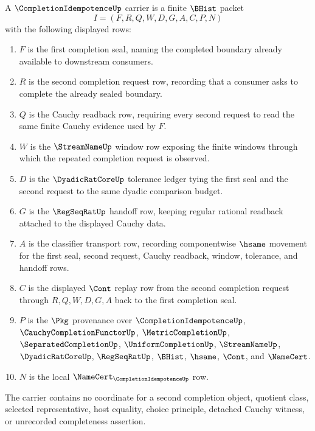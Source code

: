 \begin{definition}
\label{def:completion-idempotence-carrier}
A $\CompletionIdempotenceUp$ carrier is a finite $\BHist$ packet
$$
I=(F,R,Q,W,D,G,A,C,P,N)
$$
with the following displayed rows:
\begin{enumerate}
\item $F$ is the first completion seal, naming the completed boundary already available to downstream consumers.
\item $R$ is the second completion request row, recording that a consumer asks to complete the already sealed boundary.
\item $Q$ is the Cauchy readback row, requiring every second request to read the same finite Cauchy evidence used by $F$.
\item $W$ is the $\StreamNameUp$ window row exposing the finite windows through which the repeated completion request is observed.
\item $D$ is the $\DyadicRatCoreUp$ tolerance ledger tying the first seal and the second request to the same dyadic comparison budget.
\item $G$ is the $\RegSeqRatUp$ handoff row, keeping regular rational readback attached to the displayed Cauchy data.
\item $A$ is the classifier transport row, recording componentwise $\hsame$ movement for the first seal, second request, Cauchy readback, window, tolerance, and handoff rows.
\item $C$ is the displayed $\Cont$ replay row from the second completion request through $R,Q,W,D,G,A$ back to the first completion seal.
\item $P$ is the $\Pkg$ provenance over $\CompletionIdempotenceUp$, $\CauchyCompletionFunctorUp$, $\MetricCompletionUp$, $\SeparatedCompletionUp$, $\UniformCompletionUp$, $\StreamNameUp$, $\DyadicRatCoreUp$, $\RegSeqRatUp$, $\BHist$, $\hsame$, $\Cont$, and $\NameCert$.
\item $N$ is the local $\NameCert_{\CompletionIdempotenceUp}$ row.
\end{enumerate}
The carrier contains no coordinate for a second completion object, quotient class, selected representative, host equality, choice principle, detached Cauchy witness, or unrecorded completeness assertion.
\end{definition}

